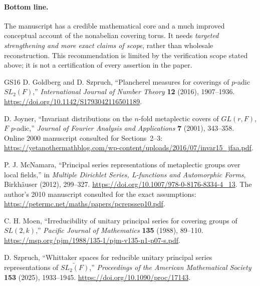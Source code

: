 \documentclass[12pt,letterpaper]{article}
\begin{document}
\paragraph{Bottom line.}
The manuscript has a credible mathematical core and a much improved conceptual account of the nonabelian covering torus. It needs \emph{targeted strengthening and more exact claims of scope}, rather than wholesale reconstruction. This recommendation is limited by the verification scope stated above; it is not a certification of every assertion in the paper.

\begin{thebibliography}{GS16}
D. Goldberg and D. Szpruch,
``Plancherel measures for coverings of $p$-adic $SL_2(F)$,''
\emph{International Journal of Number Theory} \textbf{12} (2016), 1907--1936.
\url{https://doi.org/10.1142/S1793042116501189}.

D. Joyner,
``Invariant distributions on the $n$-fold metaplectic covers of $GL(r,F)$, $F$ $p$-adic,''
\emph{Journal of Fourier Analysis and Applications} \textbf{7} (2001), 343--358.
Online 2000 manuscript consulted for Sections~2--3:
\url{https://yetanothermathblog.com/wp-content/uploads/2016/07/invar15_jfaa.pdf}.

P. J. McNamara,
``Principal series representations of metaplectic groups over local fields,''
in \emph{Multiple Dirichlet Series, L-functions and Automorphic Forms},
Birkh\"auser (2012), 299--327.
\url{https://doi.org/10.1007/978-0-8176-8334-4_13}.
The author's 2010 manuscript consulted for the exact assumptions:
\url{https://petermc.net/maths/papers/pcrepssep10.pdf}.

C. H. Moen,
``Irreducibility of unitary principal series for covering groups of $SL(2,k)$,''
\emph{Pacific Journal of Mathematics} \textbf{135} (1988), 89--110.
\url{https://msp.org/pjm/1988/135-1/pjm-v135-n1-p07-s.pdf}.

D. Szpruch,
``Whittaker spaces for reducible unitary principal series representations of $\widetilde{SL_2(F)}$,''
\emph{Proceedings of the American Mathematical Society} \textbf{153} (2025), 1933--1945.
\url{https://doi.org/10.1090/proc/17143}.
\end{thebibliography}
\end{document}
